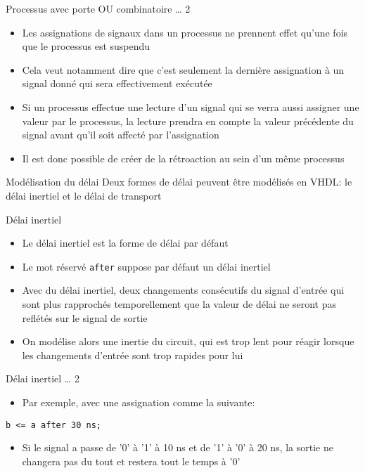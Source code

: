 \documentclass[presentation]{beamer}
\begin{document}
\begin{frame}[label={sec:org322b615}]{Processus avec porte OU combinatoire \ldots{} 2}
\begin{itemize}
\item Les assignations de signaux dans un processus ne prennent effet qu'une fois que le processus est suspendu
\item Cela veut notamment dire que c'est seulement la dernière assignation à un signal donné qui sera effectivement exécutée
\item Si un processus effectue une lecture d'un signal qui se verra aussi assigner une valeur par le processus, la lecture prendra en compte la valeur précédente du signal \alert{avant} qu'il soit affecté par l'assignation
\item Il est donc possible de créer de la rétroaction au sein d'un même processus
\end{itemize}
\end{frame}

\begin{frame}[label={sec:orgccc720c}]{Modélisation du délai}
Deux formes de délai peuvent être modélisés en VHDL: le délai inertiel et le délai de transport
\end{frame}

\begin{frame}[label={sec:org02a5476},fragile]{Délai inertiel}
 \begin{itemize}
\item Le délai inertiel est la forme de délai par défaut
\item Le mot réservé \texttt{after} suppose par défaut un délai inertiel
\item Avec du délai inertiel, deux changements consécutifs du signal d'entrée qui sont plus rapprochés temporellement que la valeur de délai ne seront pas reflétés sur le signal de sortie
\item On modélise alors une inertie du circuit, qui est trop lent pour réagir lorsque les changements d'entrée sont trop rapides pour lui
\end{itemize}
\end{frame}

\begin{frame}[label={sec:org5e09e43},fragile]{Délai inertiel \ldots{} 2}
 \begin{itemize}
\item Par exemple, avec une assignation comme la suivante:
\end{itemize}

\begin{verbatim}
b <= a after 30 ns;
\end{verbatim}

\begin{itemize}
\item Si le signal a passe de '0' à '1' à 10 ns et de '1' à '0' à 20 ns, la sortie ne changera pas du tout et restera tout le temps à '0'
\end{itemize}
\end{frame}
\end{document}
